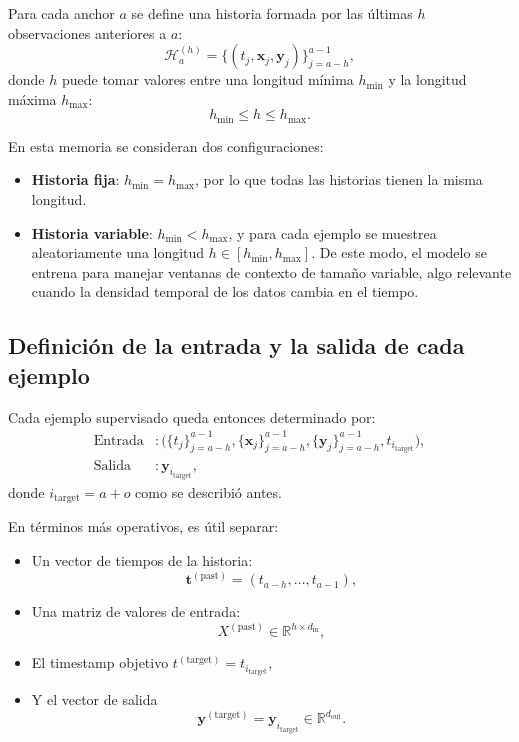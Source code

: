 Para cada anchor $a$ se define una historia formada por las últimas $h$ observaciones anteriores a $a$:
\begin{equation}
    \mathcal{H}_a^{(h)} = \{(t_j, \mathbf{x}_j, \mathbf{y}_j)\}_{j=a-h}^{a-1},
\end{equation}
donde $h$ puede tomar valores entre una longitud mínima $h_{\min}$ y la longitud máxima $h_{\max}$:
\begin{equation}
    h_{\min} \le h \le h_{\max}.
\end{equation}

En esta memoria se consideran dos configuraciones:
\begin{itemize}
    \item \textbf{Historia fija}: $h_{\min} = h_{\max}$, por lo que todas las historias tienen la misma longitud.
    \item \textbf{Historia variable}: $h_{\min} < h_{\max}$, y para cada ejemplo se muestrea aleatoriamente una longitud $h \in [h_{\min}, h_{\max}]$. De este modo, el modelo se entrena para manejar ventanas de contexto de tamaño variable, algo relevante cuando la densidad temporal de los datos cambia en el tiempo.
\end{itemize}

\subsection{Definición de la entrada y la salida de cada ejemplo}

Cada ejemplo supervisado queda entonces determinado por:
\begin{align}
    \text{Entrada} &: \Big(\{t_j\}_{j=a-h}^{a-1}, \{\mathbf{x}_j\}_{j=a-h}^{a-1}, \{\mathbf{y}_j\}_{j=a-h}^{a-1}, t_{i_{\text{target}}}\Big), \\
    \text{Salida} &: \mathbf{y}_{i_{\text{target}}},
\end{align}
donde $i_{\text{target}} = a + o$ como se describió antes.

\hfill

En términos más operativos, es útil separar:
\begin{itemize}
    \item Un vector de tiempos de la historia:
    \[
        \mathbf{t}^{(\text{past})} = (t_{a-h}, \dots, t_{a-1}),
    \]
    \item Una matriz de valores de entrada:
    \[
        X^{(\text{past})} \in \mathbb{R}^{h \times d_{\text{in}}},
    \]
    \item El timestamp objetivo $t^{(\text{target})} = t_{i_{\text{target}}}$,
    \item Y el vector de salida
    \[
        \mathbf{y}^{(\text{target})} = \mathbf{y}_{i_{\text{target}}} \in \mathbb{R}^{d_{\text{out}}}.
    \]
\end{itemize}


